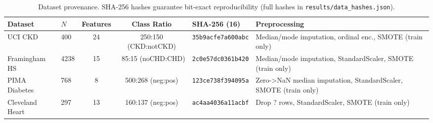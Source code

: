 \begin{table}[!ht]
\centering
\caption{Dataset provenance. SHA-256 hashes guarantee bit-exact reproducibility (full hashes in \texttt{results/data\_hashes.json}).}
\label{tab:provenance}
\begin{tabular}{llccll}
\toprule
Dataset & $N$ & Features & Class Ratio & SHA-256 (16) & Preprocessing \\
\midrule
  UCI CKD & 400 & 24 & 250:150 (CKD:notCKD) & \texttt{35b9acfe7a600abc} & \small{Median/mode imputation, ordinal enc., SMOTE (train only)} \\
  Framingham HS & 4238 & 15 & ~85:15 (noCHD:CHD) & \texttt{2c0e57dc0361b420} & \small{Median/mode imputation, StandardScaler, SMOTE (train only)} \\
  PIMA Diabetes & 768 & 8 & 500:268 (neg:pos) & \texttt{123ce738f394095a} & \small{Zero->NaN median imputation, StandardScaler, SMOTE (train only)} \\
  Cleveland Heart & 297 & 13 & 160:137 (neg:pos) & \texttt{ac4aa4036a11acbf} & \small{Drop ? rows, StandardScaler, SMOTE (train only)} \\
\bottomrule
\end{tabular}
\end{table}
